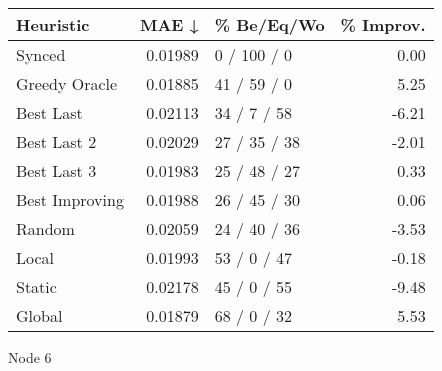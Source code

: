 \begin{tabular}{lrlr}
\toprule
\textbf{Heuristic} & \textbf{MAE ↓} & \textbf{\% Be/Eq/Wo} & \textbf{\% Improv.} \\
\midrule
            Synced &        0.01989 &          0 / 100 / 0 &                0.00 \\
     Greedy Oracle &        0.01885 &          41 / 59 / 0 &                5.25 \\
         Best Last &        0.02113 &          34 / 7 / 58 &               -6.21 \\
       Best Last 2 &        0.02029 &         27 / 35 / 38 &               -2.01 \\
       Best Last 3 &        0.01983 &         25 / 48 / 27 &                0.33 \\
    Best Improving &        0.01988 &         26 / 45 / 30 &                0.06 \\
            Random &        0.02059 &         24 / 40 / 36 &               -3.53 \\
             Local &        0.01993 &          53 / 0 / 47 &               -0.18 \\
            Static &        0.02178 &          45 / 0 / 55 &               -9.48 \\
            Global &        0.01879 &          68 / 0 / 32 &                5.53 \\
\bottomrule
\end{tabular}
\caption{Node 6}
\label{tab:non_lr01_le2_bs2_6}

